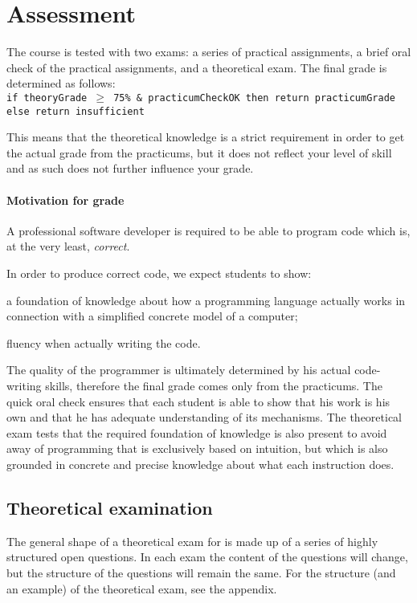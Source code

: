 \section{Assessment}
The course is tested with two exams: a series of practical assignments, a brief oral check of the practical assignments, and a theoretical exam. The final grade is determined as follows: \\

\texttt{if theoryGrade $\geq$ 75\% \& practicumCheckOK then return practicumGrade else return insufficient}

This means that the theoretical knowledge is a strict requirement in order to get the actual grade from the practicums, but it does not reflect your level of skill and as such does not further influence your grade.

\paragraph*{Motivation for grade}
A professional software developer is required to be able to program code which is, at the very least, \textit{correct}.

In order to produce correct code, we expect students to show:
\begin{inparaenum}
\item a foundation of knowledge about how a programming language actually works in connection with a simplified concrete model of a computer;
\item fluency when actually writing the code.
\end{inparaenum}

The quality of the programmer is ultimately determined by his actual code-writing skills, therefore the final grade comes only from the practicums. The quick oral check ensures that each student is able to show that his work is his own and that he has adequate understanding of its mechanisms. The theoretical exam tests that the required foundation of knowledge is also present to avoid away of programming that is exclusively based on intuition, but which is also grounded in concrete and precise knowledge about what each instruction does.


\subsection{Theoretical examination \modulecode}
The general shape of a theoretical exam for \texttt{\modulecode} is made up of a series of highly structured open questions. In each exam the content of the questions will change, but the structure of the questions will remain the same. For the structure (and an example) of the theoretical exam, see the appendix.


